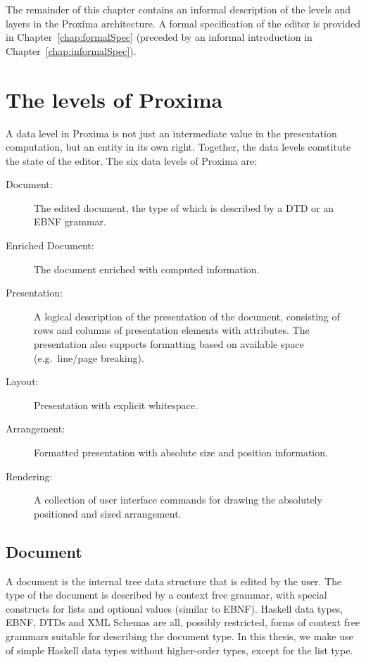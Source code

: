 The remainder of this chapter contains an informal description of the levels and layers in the Proxima architecture. A formal specification of the editor is provided in Chapter~\ref{chap:formalSpec} (preceded by an informal introduction in Chapter~\ref{chap:informalSpec}).


%																
%																
%																
\section{The levels of Proxima}

A data level in Proxima is not just an intermediate value in the presentation computation, but an entity in its own right. Together, the data levels constitute the state of the editor. The six data levels of Proxima are:

\begin{description}
\item[Document:] The edited document, the type of which is described by a DTD or an EBNF grammar.

\item[Enriched Document:] The document enriched with computed information.

\item[Presentation:] A logical description of the presentation of the document, consisting of rows and columns of presentation elements with attributes. The presentation also supports formatting based on available space (e.g.\ line/page breaking).

\item[Layout:]  Presentation with explicit whitespace.

\item[Arrangement:] Formatted presentation with absolute size and position information.

\item[Rendering:] A collection of user interface commands for drawing the absolutely positioned and sized arrangement.
\end{description}


%																
\subsection{Document} \label {sect:docLevel}

A document is the internal tree data structure that is edited by the user. The type of the document is described by a context free grammar, with special constructs for lists and optional values (similar to EBNF). Haskell data types, EBNF, DTDs and XML Schemas are all, possibly restricted, forms of context free grammars suitable for describing the document type. In this thesis, we make use of simple Haskell data types without higher-order types, except for the list type.


